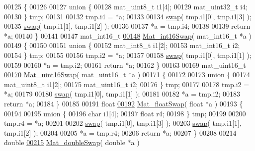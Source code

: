 \begin{DoxyCode}
00125 \{
00126 
00127     \textcolor{keyword}{union }\{
00128         mat\_uint8\_t    i1[4];
00129         mat\_uint32\_t   i4;
00130     \} tmp;
00131 
00132     tmp.i4 = *a;
00133 
00134     \hyperlink{endian_8c_a3ca5ecd34b04d6a243c054ac3a57f68d}{swap}( tmp.i1[0], tmp.i1[3] );
00135     \hyperlink{endian_8c_a3ca5ecd34b04d6a243c054ac3a57f68d}{swap}( tmp.i1[1], tmp.i1[2] );
00136 
00137     *a = tmp.i4;
00138 
00139     \textcolor{keywordflow}{return} *a;
00140 \}
00141 
00147 mat\_int16\_t
\hyperlink{endian_8c_a741eb8019dbc3e8addfc0e75adb0dd90}{00148} \hyperlink{endian_8c_a741eb8019dbc3e8addfc0e75adb0dd90}{Mat\_int16Swap}( mat\_int16\_t *a )
00149 \{
00150 
00151     \textcolor{keyword}{union }\{
00152         mat\_int8\_t   i1[2];
00153         mat\_int16\_t  i2;
00154     \} tmp;
00155 
00156     tmp.i2 = *a;
00157 
00158     \hyperlink{endian_8c_a3ca5ecd34b04d6a243c054ac3a57f68d}{swap}( tmp.i1[0], tmp.i1[1] );
00159 
00160     *a = tmp.i2;
00161     \textcolor{keywordflow}{return} *a;
00162 \}
00163 
00169 mat\_uint16\_t
\hyperlink{endian_8c_a0fd527794c69f2872e80a6f20cd09fd2}{00170} \hyperlink{endian_8c_a0fd527794c69f2872e80a6f20cd09fd2}{Mat\_uint16Swap}( mat\_uint16\_t *a )
00171 \{
00172 
00173     \textcolor{keyword}{union }\{
00174         mat\_uint8\_t   i1[2];
00175         mat\_uint16\_t  i2;
00176     \} tmp;
00177 
00178     tmp.i2 = *a;
00179 
00180     \hyperlink{endian_8c_a3ca5ecd34b04d6a243c054ac3a57f68d}{swap}( tmp.i1[0], tmp.i1[1] );
00181 
00182     *a = tmp.i2;
00183     \textcolor{keywordflow}{return} *a;
00184 \}
00185 
00191 \textcolor{keywordtype}{float}
\hyperlink{endian_8c_aec590b585dd84bbbae74a857922fced2}{00192} \hyperlink{endian_8c_aec590b585dd84bbbae74a857922fced2}{Mat\_floatSwap}( \textcolor{keywordtype}{float} *a )
00193 \{
00194 
00195     \textcolor{keyword}{union }\{
00196         \textcolor{keywordtype}{char}  i1[4];
00197         \textcolor{keywordtype}{float} r4;
00198     \} tmp;
00199 
00200     tmp.r4 = *a;
00201 
00202     \hyperlink{endian_8c_a3ca5ecd34b04d6a243c054ac3a57f68d}{swap}( tmp.i1[0], tmp.i1[3] );
00203     \hyperlink{endian_8c_a3ca5ecd34b04d6a243c054ac3a57f68d}{swap}( tmp.i1[1], tmp.i1[2] );
00204 
00205     *a = tmp.r4;
00206     \textcolor{keywordflow}{return} *a;
00207 \}
00208 
00214 \textcolor{keywordtype}{double}
\hyperlink{endian_8c_a7f548ab23c3b06fa90ef646ed43dc558}{00215} \hyperlink{endian_8c_a7f548ab23c3b06fa90ef646ed43dc558}{Mat\_doubleSwap}( \textcolor{keywordtype}{double} *a )

\end{DoxyCode}
